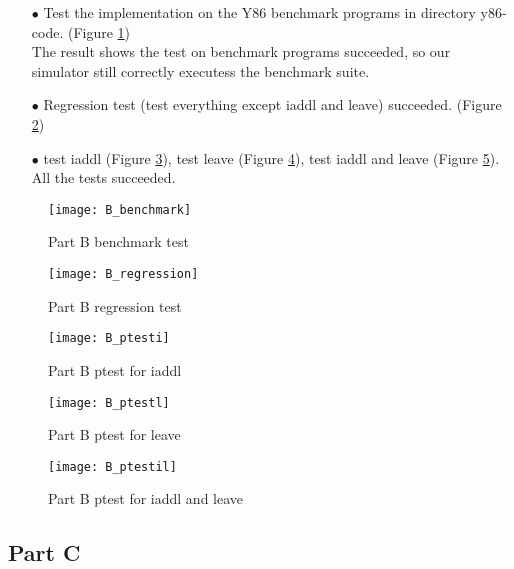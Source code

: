 \documentclass{article}
\begin{document}
\begin{itemize}
\item[$\bullet$]Test the implementation on the Y86 benchmark programs in directory {\ttfamily y86-code}.  (Figure \ref{Part B: benchmark test})\\
The result shows the test on benchmark programs succeeded, so our simulator still correctly executess the benchmark suite.
\item[$\bullet$]Regression test (test everything except {\ttfamily iaddl} and {\ttfamily leave}) succeeded. (Figure \ref{Part B: regression test})
\item[$\bullet$]test {\ttfamily iaddl} (Figure \ref{Part B: ptest for iaddl}), test {\ttfamily leave} (Figure \ref{Part B: ptest for leave}), test {\ttfamily iaddl} and {\ttfamily leave} (Figure \ref{Part B: ptest for iaddl and leave}).\\
All the tests  succeeded.
\end{itemize}
\begin{figure}[htbp]%
		\centering%
		\texttt{[image: B\_benchmark]}
		\caption{Part B benchmark test} \label{Part B: benchmark test}%
\end{figure}
\begin{figure}[htbp]%
		\centering%
		\texttt{[image: B\_regression]}
		\caption{Part B regression test} \label{Part B: regression test}%
\end{figure}
\begin{figure}[htbp]%
		\centering%
		\texttt{[image: B\_ptesti]}
		\caption{Part B ptest for {\ttfamily iaddl}} \label{Part B: ptest for iaddl}%
\end{figure}
\begin{figure}[htbp]%
		\centering%
		\texttt{[image: B\_ptestl]}
		\caption{Part B ptest for {\ttfamily leave}} \label{Part B: ptest for leave}%
\end{figure}
\begin{figure}[htbp]%
		\centering%
		\texttt{[image: B\_ptestil]}
		\caption{Part B ptest for {\ttfamily iaddl} and {\ttfamily leave}} \label{Part B: ptest for iaddl and leave}%
\end{figure}

\newpage
\subsection{Part C}
\end{document}
